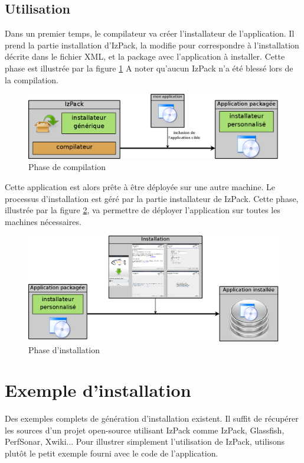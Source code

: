 \subsection{Utilisation}
Dans un premier temps, le compilateur va créer l'installateur de l'application.
Il prend la partie installation d'IzPack, la modifie pour correspondre à l'installation décrite dans le fichier XML, et la package avec l'application à installer. Cette phase est illustrée par la figure \ref{fig:partie_compil}
A noter qu'aucun IzPack n'a été blessé lors de la compilation.
\begin{figure}[H]
	\centering
	\includegraphics[width=\textwidth]{../image/partie_compil.png}
	\caption{Phase de compilation}
	\label{fig:partie_compil}
\end{figure}

Cette application est alors prête à être déployée sur une autre machine.
Le processus d'installation est géré par la partie installateur de IzPack.
Cette phase, illustrée par la figure \ref{fig:partie_install}, va permettre de déployer l'application sur toutes les machines nécessaires.
\begin{figure}[H]
	\centering
	\includegraphics[width=\textwidth]{../image/partie_install.png}
	\caption{Phase d'installation}
	\label{fig:partie_install}
\end{figure}

\section{Exemple d'installation}
Des exemples complets de génération d'installation existent.
Il suffit de récupérer les sources d'un projet open-source utilisant IzPack comme IzPack, Glassfish, PerfSonar, Xwiki... 
Pour illustrer simplement l'utilisation de IzPack, utilisons plutôt le petit exemple fourni avec le code de l'application.
